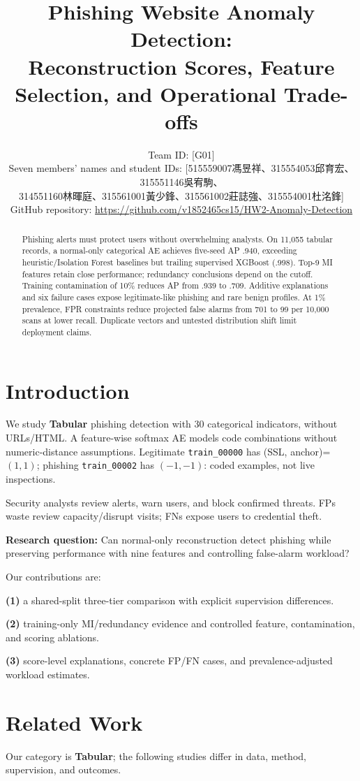 \documentclass[11pt]{article}
\title{Phishing Website Anomaly Detection:\\Reconstruction Scores, Feature Selection, and Operational Trade-offs}
\author{Team ID: [G01] \\
Seven members' names and student IDs: [515559007馮昱祥、315554053邱育宏、315551146吳宥駒、\\314551160林暉庭、315561001黃少鋒、315561002莊誌強、315554001杜洺鋒] \\
GitHub repository: \url{https://github.com/v1852465cs15/HW2-Anomaly-Detection}}
\begin{document}
\maketitle
\begin{abstract}
Phishing alerts must protect users without overwhelming analysts. On 11,055 tabular records, a normal-only categorical AE achieves five-seed AP .940, exceeding heuristic/Isolation Forest baselines but trailing supervised XGBoost (.998). Top-9 MI features retain close performance; redundancy conclusions depend on the cutoff. Training contamination of 10\% reduces AP from .939 to .709. Additive explanations and six failure cases expose legitimate-like phishing and rare benign profiles. At 1\% prevalence, FPR constraints reduce projected false alarms from 701 to 99 per 10,000 scans at lower recall. Duplicate vectors and untested distribution shift limit deployment claims.
\end{abstract}
\section{Introduction}
We study \textbf{Tabular} phishing detection with 30 categorical indicators, without URLs/HTML. A feature-wise softmax AE models code combinations without numeric-distance assumptions. Legitimate \texttt{train\_00000} has (SSL, anchor)=$(1,1)$; phishing \texttt{train\_00002} has $(-1,-1)$: coded examples, not live inspections.

Security analysts review alerts, warn users, and block confirmed threats. FPs waste review capacity/disrupt visits; FNs expose users to credential theft.

\textbf{Research question:} Can normal-only reconstruction detect phishing while preserving performance with nine features and controlling false-alarm workload?

Our contributions are:

\textbf{(1)} a shared-split three-tier comparison with explicit supervision differences.

\textbf{(2)} training-only MI/redundancy evidence and controlled feature, contamination, and scoring ablations.

\textbf{(3)} score-level explanations, concrete FP/FN cases, and prevalence-adjusted workload estimates.

\section{Related Work}
Our category is \textbf{Tabular}; the following studies differ in data, method, supervision, and outcomes.
\end{document}
